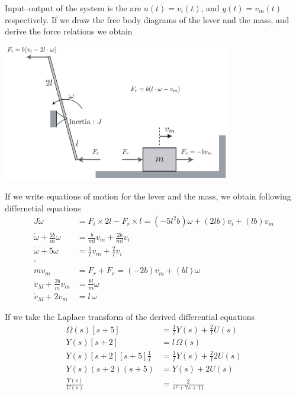 \documentclass[twoside]{article}
\theoremstyle{definition}
\begin{document}
Input--output of the system is the are $u(t) = v_i(t)$, and
$y(t) = v_m(t)$ respectively. If we draw the free body diagrams of
the lever and the mass, and derive the force relations we obtain

\vspace{12pt}
  
\begin{minipage}[h]{1\linewidth}
    \begin{center}
      \includegraphics[width=0.75\textwidth]{lever_solution}
    \end{center}
\end{minipage}   

\vspace{12pt}

If we write equations of motion for the lever and the mass, 
we obtain following differnetial equations
%
\begin{align*}
  J \dot{\omega} &= F_i \times 2l - F_r \times l  = (- 5 l^2 b) \omega + (2 l b) v_i + (l b) v_m 
  \\
\dot{\omega} + \frac{5 b}{m} \omega &= \frac{b}{m l} v_m + \frac{2
                                          b}{m l} v_i
  \\
\dot{\omega} + 5 \omega &= \frac{1}{l} v_m + \frac{2}{l} v_i
\\
,
\\
m \dot{v}_m &= F_r + F_v  = (- 2 b) v_m + ( b l ) \omega
\\
 \dot{v}_M + \frac{2 b}{m} v_m  &= \frac{ b l }{m} \omega
\\
 \dot{v}_M + 2 v_m  &= l \, \omega
\end{align*}

If we take the Laplace transform of the derived differential equations
%
\begin{align*}
\Omega(s) \left[ s + 5 \right] &= \frac{1}{l} Y(s) + \frac{2}{l} U(s)
\\
Y(s) \left[ s + 2 \right] &= l \, \Omega(s)
\\
Y(s) \left[ s + 2 \right]\left[ s + 5 \right] \frac{1}{l} &=
                                                            \frac{1}{l}
                                                            Y(s) +
                                                            \frac{2}{l}
                                                           2 U(s)
\\
Y(s) ( s + 2 ) ( s + 5 ) &= Y(s) + 2 U(s)
\\
\frac{Y(s)}{U(s)} &= \frac{2}{s^2 + 7 s + 11}
\end{align*}
\end{document}
